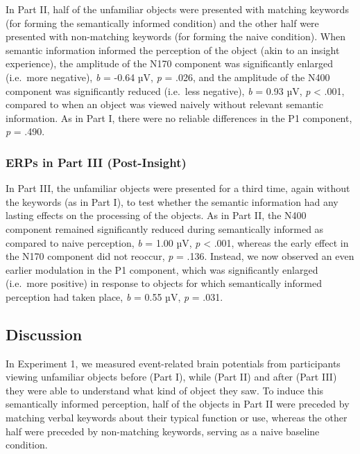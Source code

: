 \documentclass[
  english,
  man,11pt,floatsintext]{apa7}
\begin{document}
In Part II, half of the unfamiliar objects were presented with matching keywords (for forming the semantically informed condition) and the other half were presented with non-matching keywords (for forming the naive condition). When semantic information informed the perception of the object (akin to an insight experience), the amplitude of the N170 component was significantly enlarged (i.e.~more negative), \emph{b} = -0.64 µV, \emph{p} = .026, and the amplitude of the N400 component was significantly reduced (i.e.~less negative), \emph{b} = 0.93 µV, \emph{p} \textless{} .001, compared to when an object was viewed naively without relevant semantic information. As in Part I, there were no reliable differences in the P1 component, \emph{p} = .490.

\hypertarget{erps-in-part-iii-post-insight}{%
\subsubsection{ERPs in Part III (Post-Insight)}\label{erps-in-part-iii-post-insight}}

In Part III, the unfamiliar objects were presented for a third time, again without the keywords (as in Part I), to test whether the semantic information had any lasting effects on the processing of the objects. As in Part II, the N400 component remained significantly reduced during semantically informed as compared to naive perception, \emph{b} = 1.00 µV, \emph{p} \textless{} .001, whereas the early effect in the N170 component did not reoccur, \emph{p} = .136. Instead, we now observed an even earlier modulation in the P1 component, which was significantly enlarged (i.e.~more positive) in response to objects for which semantically informed perception had taken place, \emph{b} = 0.55 µV, \emph{p} = .031.

\hypertarget{discussion}{%
\subsection{Discussion}\label{discussion}}

In Experiment 1, we measured event-related brain potentials from participants viewing unfamiliar objects before (Part I), while (Part II) and after (Part III) they were able to understand what kind of object they saw. To induce this semantically informed perception, half of the objects in Part II were preceded by matching verbal keywords about their typical function or use, whereas the other half were preceded by non-matching keywords, serving as a naive baseline condition.
\end{document}

